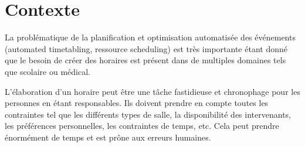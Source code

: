 \section{Contexte}
La problématique de la planification et optimisation automatisée des événements (automated timetabling, ressource scheduling) est très importante étant donné que le besoin de créer des horaires est présent dans de multiples domaines tels que scolaire ou médical.

L’élaboration d’un horaire peut être une tâche fastidieuse et chronophage pour les personnes en étant responsables. Ils doivent prendre en compte toutes les contraintes tel que les différents types de salle, la disponibilité des intervenants, les préférences personnelles, les contraintes de temps, etc. Cela peut prendre énormément de temps et est prône aux erreurs humaines.